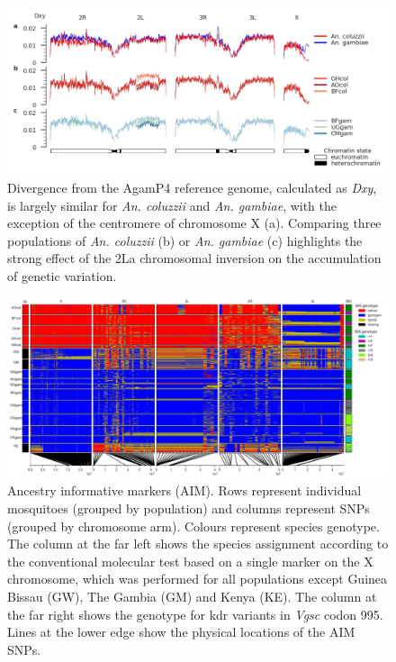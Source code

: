 \documentclass[a4paper,11pt,abstracton,hidelinks]{scrartcl}
\begin{document}
\begin{figure}[H]
	\begin{center}
		\includegraphics*[width=6.3in]{notebooks/refdiff/refdiff_phase2_combined.jpg}
	\end{center}
	\caption{Divergence from the AgamP4 reference genome, calculated as \textit{Dxy}, is largely similar for \textit{An. coluzzii} and \textit{An. gambiae}, with the exception of the centromere of chromosome X (a). Comparing three populations of \textit{An. coluzzii} (b) or \textit{An. gambiae} (c) highlights the strong effect of the 2La chromosomal inversion on the accumulation of genetic variation.}
	\label{refdiff}
\end{figure}


\begin{figure}[H]
	\begin{center}
		\includegraphics*[width=6.3in]{artwork/AIM_figure_scaled.jpg}
	\end{center}
	\caption{Ancestry informative markers (AIM). Rows represent individual mosquitoes (grouped by population) and columns represent SNPs (grouped by chromosome arm). Colours represent species genotype. The column at the far left shows the species assignment according to the conventional molecular test based on a single marker on the X chromosome, which was performed for all populations except Guinea Bissau (GW), The Gambia (GM) and Kenya (KE). The column at the far right shows the genotype for kdr variants in \textit{Vgsc} codon 995. Lines at the lower edge show the physical locations of the AIM SNPs.}
	\label{aim}
\end{figure}
\end{document}
